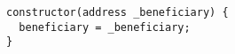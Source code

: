 \begin{lstlisting}[language=Solidity]
constructor(address _beneficiary) {
  beneficiary = _beneficiary;
}
\end{lstlisting}
